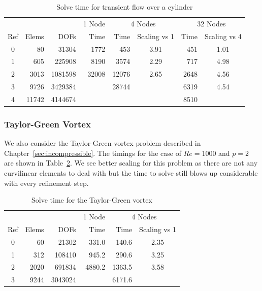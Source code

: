 \documentclass[Dissertation.tex]{subfiles}
\begin{document}
\begin{table}[!ht]
\centering
\caption{Solve time for transient flow over a cylinder}
\label{tab:cylinder}
\begin{tabular}{|crr|r|rc|rc|}
\hline
& & & 1 Node & \multicolumn{2}{|c|}{4 Nodes} & \multicolumn{2}{|c|}{32 Nodes} \\
Ref& Elems & DOFs & Time    & Time & Scaling vs 1     & Time & Scaling vs 4      \\
\hline
0 & 80            & 31304      & 1772   & 453   & 3.91 & 451  & 1.01 \\
1 & 605           & 225908     & 8190   & 3574  & 2.29 & 717  & 4.98 \\
2 & 3013          & 1081598    & 32008  & 12076 & 2.65 & 2648 & 4.56 \\
3 & 9726          & 3429384    &          & 28744 &      & 6319 & 4.54 \\
4 & 11742         & 4144674    &          &         &      & 8510 &      \\
\hline
\end{tabular}
\end{table}

\subsubsection{Taylor-Green Vortex}
We also consider the Taylor-Green vortex problem described in Chapter~\ref{sec:incompressible}.
The timings for the case of $Re=1000$ and $p=2$ are shown in Table~\ref{tab:taylor}.
We see better scaling for this problem as there are not any curvilinear elements to deal with
but the time to solve still blows up considerable with every refinement step.

\begin{table}[!ht]
\centering
\caption{Solve time for the Taylor-Green vortex}
\label{tab:taylor}
\begin{tabular}{|crr|r|rc|}
\hline
& & & 1 Node & \multicolumn{2}{|c|}{4 Nodes} \\
Ref& Elems & DOFs & Time    & Time & Scaling vs 1 \\
\hline
0 & 60            & 21302      & 331.0    & 140.6   & 2.35 \\
1 & 312           & 108410     & 945.2    & 290.6   & 3.25 \\
2 & 2020          & 691834     & 4880.2   & 1363.5  & 3.58 \\
3 & 9244          & 3043024    &          & 6171.6  & \\
\hline
\end{tabular}
\end{table}
\end{document}
